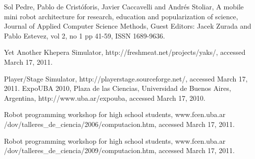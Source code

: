 \begin{thebibliography}{19}
 Sol Pedre, Pablo de Cristóforis, Javier Caccavelli and Andrés Stoliar, A mobile mini robot architecture for research, education and popularization of science, Journal of Applied Computer Science Methods, Guest Editors: Jacek Zurada and Pablo Estevez, vol 2, no 1 pp 41-59, ISSN 1689-9636. 

 Yet Another Khepera Simulator, http://freshmeat.net/projects/yaks/, accessed March 17, 2011. 

 Player/Stage Simulator, http://playerstage.sourceforge.net/, accessed March 17, 2011.
 ExpoUBA 2010, Plaza de las Ciencias, Universidad de Buenos Aires, Argentina, http://www.uba.ar/expouba, accessed March 17, 2010. %

 Robot programming workshop for high school students, www.fcen.uba.ar /dov/talleres\_de\_ciencia/2006/computacion.htm, accessed March 17, 2011. 

 Robot programming workshop for high school students, www.fcen.uba.ar /dov/talleres\_de\_ciencia/2009/computacion.htm, accessed March 17, 2011.

\end{thebibliography}